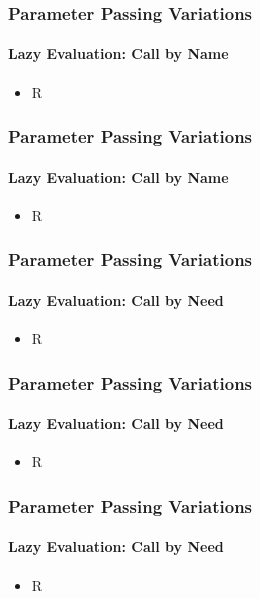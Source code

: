 \documentclass{beamer}
\begin{document}
\begin{frame}[fragile]
\frametitle{Parameter Passing Variations}
\framesubtitle{Lazy Evaluation: Call by Name}
\begin{scriptsize}
\begin{itemize}
\item<1-> R

\end{itemize}
\end{scriptsize}
\end{frame}

\begin{frame}[fragile]
\frametitle{Parameter Passing Variations}
\framesubtitle{Lazy Evaluation: Call by Name}
\begin{scriptsize}
\begin{itemize}
\item<1-> R

\end{itemize}
\end{scriptsize}
\end{frame}



\begin{frame}[fragile]
\frametitle{Parameter Passing Variations}
\framesubtitle{Lazy Evaluation: Call by Need}
\begin{scriptsize}
\begin{itemize}
\item<1-> R

\end{itemize}
\end{scriptsize}
\end{frame}

\begin{frame}[fragile]
\frametitle{Parameter Passing Variations}
\framesubtitle{Lazy Evaluation: Call by Need}
\begin{scriptsize}
\begin{itemize}
\item<1-> R

\end{itemize}
\end{scriptsize}
\end{frame}

\begin{frame}[fragile]
\frametitle{Parameter Passing Variations}
\framesubtitle{Lazy Evaluation: Call by Need}
\begin{scriptsize}
\begin{itemize}
\item<1-> R

\end{itemize}
\end{scriptsize}
\end{frame}
\end{document}
